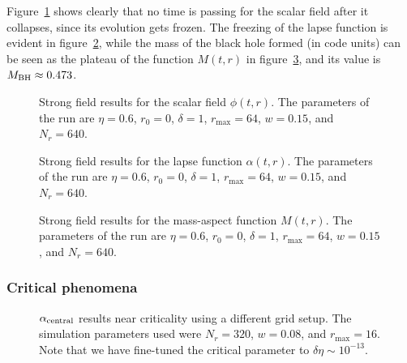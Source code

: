 \documentclass[a4paper,11pt]{article}
\renewcommand{\a}{\alpha}
\renewcommand{\d}{\delta}
\begin{document}
Figure~\ref{fig:phi_strong} shows clearly that no time is passing for the scalar field after it collapses, since its evolution gets frozen. The freezing of the lapse function is evident in figure~\ref{fig:alpha_strong}, while the mass of the black hole formed (in code units) can be seen as the plateau of the function $M(t,r)$ in figure~\ref{fig:mass_strong}, and its value is $M_{\rm BH}\approx0.473$.

\begin{figure}[H]
  \centering
  
  \caption[Strong field results for the scalar field $\phi(t,r)$.]{Strong field results for the scalar field $\phi(t,r)$. The parameters of the run are $\eta=0.6$, $r_{0}=0$, $\delta=1$, $r_{\max}=64$, $w=0.15$, and $N_{r}=640$.}
  \label{fig:phi_strong}
\end{figure}

\begin{figure}[H]
  \centering
  
  \caption[Strong field results for the lapse function $\a(t,r)$.]{Strong field results for the lapse function $\a(t,r)$. The parameters of the run are $\eta=0.6$, $r_{0}=0$, $\delta=1$, $r_{\max}=64$, $w=0.15$, and $N_{r}=640$.}
  \label{fig:alpha_strong}
\end{figure}

\begin{figure}[H]
  \centering
  
  \caption[Strong field results for the mass-aspect function $M(t,r)$.]{Strong field results for the mass-aspect function $M(t,r)$. The parameters of the run are $\eta=0.6$, $r_{0}=0$, $\delta=1$, $r_{\max}=64$, $w=0.15$, and $N_{r}=640$.}
  \label{fig:mass_strong}
\end{figure}

\subsubsection{Critical phenomena}

\begin{figure}[H]
  \centering
  
  \caption[$\alpha_{\rm central}$ results near criticality using a different grid setup.]{$\alpha_{\rm central}$ results near criticality using a different grid setup. The simulation parameters used were $N_{r}=320$, $w=0.08$, and $r_{\max}=16$. Note that we have fine-tuned the critical parameter to $\d\eta\sim10^{-13}$.}
  \label{fig:critical_alpha}
\end{figure}
\end{document}
